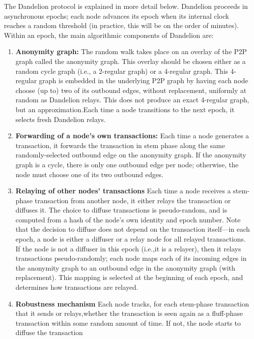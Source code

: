 \documentclass{article}
\begin{document}
The {\sf Dandelion} protocol is explained in more detail below. {\sf Dandelion} proceeds in asynchronous epochs; each node advances its epoch when its internal clock reaches a random threshold (in practice, this will be on the order of minutes). Within an epoch, the main algorithmic components of {\sf Dandelion} are:
\begin{enumerate}
    \item \textbf{Anonymity graph:} The random walk takes place on an overlay of the P2P graph called the anonymity graph. This overlay should be chosen either as a random cycle graph (i.e., a 2-regular graph) or a 4-regular graph. This 4-regular graph is embedded in the underlying P2P graph by having each node choose (up to) two of its outbound edges, without replacement, uniformly at random as {\sf Dandelion} relays. This does not produce an exact 4-regular graph, but an approximation.Each time a node transitions to the next epoch, it selects fresh {\sf Dandelion} relays.
    \item \textbf{Forwarding of a node’s own transactions:} Each time a node generates a transaction, it forwards the transaction in stem phase along the same randomly-selected outbound edge on the anonymity graph. If the anonymity graph is a cycle, there is only one outbound edge per node; otherwise, the node must choose one of its two outbound edges.
    \item \textbf{Relaying of other nodes’ transactions} Each time a node receives a stem-phase transaction from another node, it either relays the transaction or diffuses it. The choice to diffuse transactions is pseudo-random, and is computed from a hash of the node’s own identity and epoch number. Note that the decision to diffuse does not depend on the transaction itself—in each epoch, a node is either a diffuser or a relay node for all relayed transactions. If the node is not a diffuser in this epoch (i.e.,it is a relayer), then it relays transactions pseudo-randomly; each node maps each of its incoming edges in the anonymity graph to an outbound edge in the anonymity graph (with replacement). This mapping is selected at the beginning of each epoch, and determines how transactions are relayed.
    \item \textbf{Robustness mechanism} Each node tracks, for each stem-phase transaction that it sends or relays,whether the transaction is seen again as a fluff-phase transaction within some random amount of time. If not, the node starts to diffuse the transaction
\end{enumerate}
\end{document}

